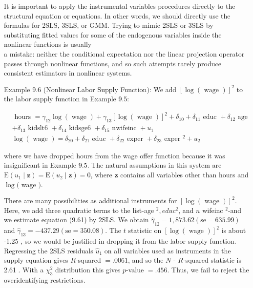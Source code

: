 \documentclass[10pt]{article}
\begin{document}
It is important to apply the instrumental variables procedures directly to the structural equation or equations. In other words, we should directly use the formulas for 2SLS, 3SLS, or GMM. Trying to mimic 2SLS or 3SLS by substituting fitted values for some of the endogenous variables inside the nonlinear functions is usually\\
a mistake: neither the conditional expectation nor the linear projection operator passes through nonlinear functions, and so such attempts rarely produce consistent estimators in nonlinear systems.

Example 9.6 (Nonlinear Labor Supply Function): We add $[\log (\text { wage })]^{2}$ to the labor supply function in Example 9.5:


\begin{align*}
& \text { hours }= \gamma_{12} \log (\text { wage })+\gamma_{13}[\log (\text { wage })]^{2}+\delta_{10}+\delta_{11} \text { educ }+\delta_{12} \text { age } \\
&+\delta_{13} \text { kidslt6 }+\delta_{14} \text { kidsge6 }+\delta_{15} \text { nwifeinc }+u_{1}  \tag{9.61}\\
& \log (\text { wage })=\delta_{20}+\delta_{21} \text { educ }+\delta_{22} \text { exper }+\delta_{23} \text { exper }^{2}+u_{2} \tag{9.62}
\end{align*}


where we have dropped hours from the wage offer function because it was insignificant in Example 9.5. The natural assumptions in this system are $\mathrm{E}\left(u_{1} \mid \mathbf{z}\right)= \mathrm{E}\left(u_{2} \mid \mathbf{z}\right)=0$, where $\mathbf{z}$ contains all variables other than hours and $\log ($ wage $)$.

There are many possibilities as additional instruments for $[\log (\text { wage })]^{2}$. Here, we add three quadratic terms to the list-age ${ }^{2}, e d u c^{2}$, and $n$ wifeinc ${ }^{2}$-and we estimate equation (9.61) by 2SLS. We obtain $\hat{\gamma}_{12}=1,873.62(\mathrm{se}=635.99)$ and $\hat{\gamma}_{13}=-437.29 (\mathrm{se}=350.08)$. The $t$ statistic on $[\log (\text { wage })]^{2}$ is about -1.25 , so we would be justified in dropping it from the labor supply function. Regressing the 2SLS residuals $\hat{u}_{1}$ on all variables used as instruments in the supply equation gives $R$-squared $=.0061$, and so the $N$ - $R$-squared statistic is 2.61 . With a $\chi_{3}^{2}$ distribution this gives $p$-value $=.456$. Thus, we fail to reject the overidentifying restrictions.
\end{document}
